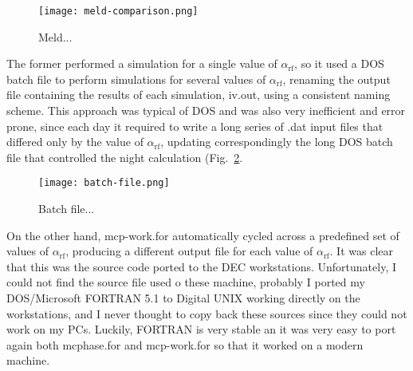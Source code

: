 \begin{figure}[bt]
	\centering
	\texttt{[image: meld-comparison.png]}
	\caption{Meld...}
	\label{fig:meld-comparison}
\end{figure}


The former performed a simulation for a single value of $\alpha_\mathrm{rf}$, so it used a DOS batch file to perform simulations for several values of $\alpha_\mathrm{rf}$, renaming the output file containing the results of each simulation, \textsf{iv.out}, using a consistent naming scheme.
This approach was typical of DOS and was also very inefficient and error prone, since each day it required to write a long series of \textsf{.dat} input files that differed only by the value of $\alpha_\mathrm{rf}$, updating correspondingly the long DOS batch file that controlled the night calculation (Fig.~\ref{fig:batch-file}.

\begin{figure}[tbh]
	\centering
	\texttt{[image: batch-file.png]}
	\caption{Batch file...}
	\label{fig:batch-file}
\end{figure}


On the other hand, \textsf{mcp-work.for} automatically cycled across a predefined set of values of $\alpha_\mathrm{rf}$, producing a different output file for each value of $\alpha_\mathrm{rf}$. It was clear that this was the source code ported to the DEC workstations. 
Unfortunately, I could not find the source file used o these machine, probably I ported my DOS/Microsoft FORTRAN 5.1 to Digital UNIX working directly on the workstations, and I never thought to copy back these sources since they could not work on my PCs.
Luckily, FORTRAN is very stable an it was very easy to port again both \textsf{mcphase.for} and \textsf{mcp-work.for} so that it worked on a modern machine.

